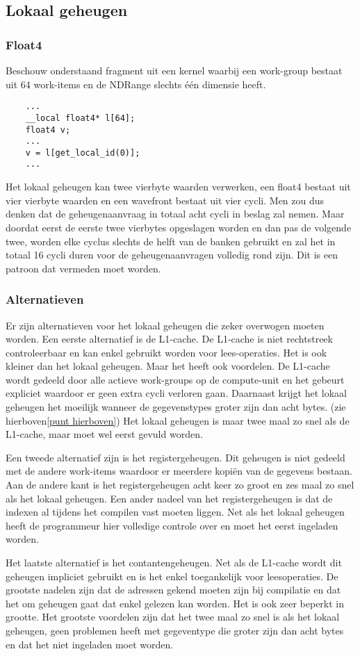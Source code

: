 \subsection{Lokaal geheugen}
\subsubsection{Float4}
Beschouw onderstaand fragment uit een kernel waarbij een work-group bestaat uit 64 work-items en de NDRange slechts \'e\'en dimensie heeft.
\begin{lstlisting}
	...
    __local float4* l[64];
    float4 v;
    ...
    v = l[get_local_id(0)];
    ...
\end{lstlisting}
Het lokaal geheugen kan twee vierbyte waarden verwerken, een float4 bestaat uit vier vierbyte waarden en een wavefront bestaat uit vier cycli. Men zou dus denken dat de geheugenaanvraag in totaal acht cycli in beslag zal nemen. Maar doordat eerst de eerste twee vierbytes opgeslagen worden en dan pas de volgende twee, worden elke cyclus slechts de helft van de banken gebruikt en zal het in totaal 16 cycli duren voor de geheugenaanvragen volledig rond zijn. Dit is een patroon dat vermeden moet worden.

\subsubsection{Alternatieven}
Er zijn alternatieven voor het lokaal geheugen die zeker overwogen moeten worden. Een eerste alternatief is de L1-cache. De L1-cache is niet rechtstreek controleerbaar en kan enkel gebruikt worden voor lees-operaties. Het is ook kleiner dan het lokaal geheugen. Maar het heeft ook voordelen. De L1-cache wordt gedeeld door alle actieve work-groups op de compute-unit en het gebeurt expliciet waardoor er geen extra cycli verloren gaan. Daarnaast krijgt het lokaal geheugen het moeilijk wanneer de gegevenstypes groter zijn dan acht bytes. (zie hierboven\ref{punt hierboven}) Het lokaal geheugen is maar twee maal zo snel als de L1-cache, maar moet wel eerst gevuld worden.

Een tweede alternatief zijn is het registergeheugen. Dit geheugen is niet gedeeld met de andere work-items waardoor er meerdere kopi\"en van de gegevens bestaan. Aan de andere kant is het registergeheugen acht keer zo groot en zes maal zo snel als het lokaal geheugen. Een ander nadeel van het registergeheugen is dat de indexen al tijdens het compilen vast moeten liggen. Net als het lokaal geheugen heeft de programmeur hier volledige controle over en moet het eerst ingeladen worden.

Het laatste alternatief is het contantengeheugen. Net als de L1-cache wordt dit geheugen impliciet gebruikt en is het enkel toegankelijk voor leesoperaties. De grootste nadelen zijn dat de adressen gekend moeten zijn bij compilatie en dat het om geheugen gaat dat enkel gelezen kan worden. Het is ook zeer beperkt in grootte. Het grootste voordelen zijn dat het twee maal zo snel is als het lokaal geheugen, geen problemen heeft met gegeventype die groter zijn dan acht bytes en dat het niet ingeladen moet worden.